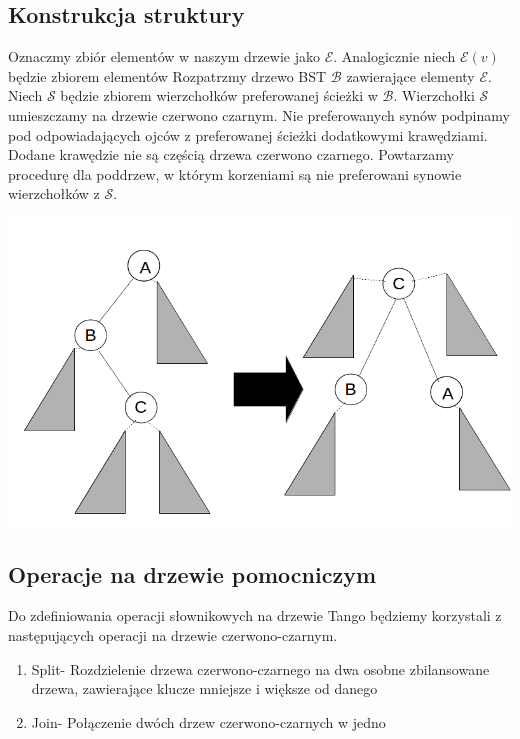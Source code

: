 \documentclass[declaration,shortabstract]{iithesis}
\theoremstyle{remark}
\theoremstyle{plain}
\theoremstyle{plain}
\theoremstyle{plain}
\begin{document}
\subsection{Konstrukcja struktury}

Oznaczmy zbiór elementów w naszym drzewie jako \(\mathcal{E}\). Analogicznie niech \(\mathcal{E}(v)\) będzie zbiorem elementów 
Rozpatrzmy drzewo BST \(\mathcal{B}\) zawierające elementy \(\mathcal{E}\). Niech \( \mathcal{S}\) będzie zbiorem wierzchołków preferowanej ścieżki w \(\mathcal{B}\). Wierzchołki \(\mathcal{S}\) umieszczamy na drzewie czerwono czarnym. Nie preferowanych synów podpinamy pod odpowiadających ojców z preferowanej ścieżki dodatkowymi krawędziami. Dodane krawędzie nie są częścią drzewa czerwono czarnego. Powtarzamy procedurę dla poddrzew, w którym korzeniami są nie preferowani synowie wierzchołków z \(\mathcal{S}\).

\includegraphics[scale=0.5]{Tango_path2.png}

\subsection{Operacje na drzewie pomocniczym}
Do zdefiniowania operacji słownikowych na drzewie Tango będziemy korzystali z następujących operacji na drzewie czerwono-czarnym. 
\begin{enumerate}
\item{Split- Rozdzielenie drzewa czerwono-czarnego na dwa osobne zbilansowane drzewa, zawierające klucze mniejsze i większe od danego}
\item{Join- Połączenie dwóch drzew czerwono-czarnych w jedno}
\end{enumerate}
\end{document}
